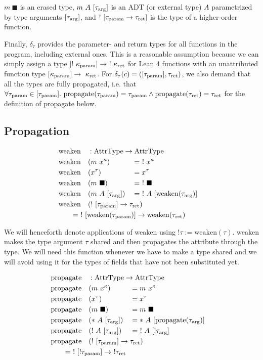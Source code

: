 $m\ \blacksquare$ is an erased type, $m\ A\ [\tau_{\mathrm{arg}}]$ is an ADT (or external type) $A$ parametrized by type arguments $[\tau_{\mathrm{arg}}]$, and $!\ [\tau_{\mathrm{param}} \to \tau_{\mathrm{ret}}]$ is the type of a higher-order function. 

Finally, $\delta_\tau$ provides the parameter- and return types for all functions in the program, including external ones. This is a reasonable assumption because we can simply assign a type $[!\ \kappa_\param] \to \ !\ \kappa_\ret$ for Lean 4 functions with an unattributed function type $[\kappa_{\mathrm{param}}] \to \ \kappa_{\mathrm{ret}}$. For $\delta_\tau(c) = ([\tau_{\mathrm{param}}], \tau_{\mathrm{ret}})$, we also demand that all the types are fully propagated, i.e. that $\forall \tau_{\mathrm{param}} \in [\tau_{\mathrm{param}}].\ \mathrm{propagate}(\tau_{\mathrm{param}}) = \tau_{\mathrm{param}} \land \mathrm{propagate}(\tau_{\mathrm{ret}}) = \tau_{\mathrm{ret}}$ for the definition of propagate below.

\subsection{Propagation}

\newcommand{\weaken}{\mathrm{weaken}}
\newcommand{\rebreak}[1]{\mathrlap{\qquad#1}}

\begin{alignat*}{3}
  &\weaken &&: \mathrlap{\AttrType \to \AttrType} \\
  &\weaken&&(m\ x^\kappa) &&=\ !\ x^\kappa \\
  &\weaken&&(x^\tau) &&= x^\tau \\
  &\weaken&&(m\ \blacksquare) &&=\ !\ \blacksquare \\
  &\weaken&&(m\ A\ [\tau_\arrg]) &&=\ !\ A\ [\weaken(\tau_\arrg)] \\
  &\weaken&&\mathrlap{(!\ [\tau_\param] \to \tau_\ret)} \\
  &\rebreak{= \ !\ [\weaken(\tau_\param)] \to \weaken(\tau_\ret)}
\end{alignat*}

We will henceforth denote applications of weaken using $!\tau := \weaken(\tau)$. weaken makes the type argument $\tau$ shared and then propagates the attribute through the type. We will need this function whenever we have to make a type shared and we will avoid using it for the types of fields that have not been substituted yet.

\newcommand{\propagate}{\mathrm{propagate}}

\begin{alignat*}{3}
  &\propagate &&: \mathrlap{\AttrType \to \AttrType} \\
  &\propagate&&(m\ x^\kappa) &&= m\ x^\kappa \\
  &\propagate&&(x^\tau) &&= x^\tau \\
  &\propagate&&(m\ \blacksquare) &&= m\ \blacksquare \\
  &\propagate&&(*\ A\ [\tau_\arrg]) &&= *\ A\ [\propagate(\tau_\arrg)] \\
  &\propagate&&(!\ A\ [\tau_\arrg]) &&= \ !\ A\ [!\tau_\arrg] \\
  &\propagate&&\mathrlap{(!\ [\tau_\param] \to \tau_\ret)} \\
  &\rebreak{= \ !\ [!\tau_\param] \to\ !\tau_\ret}
\end{alignat*}

